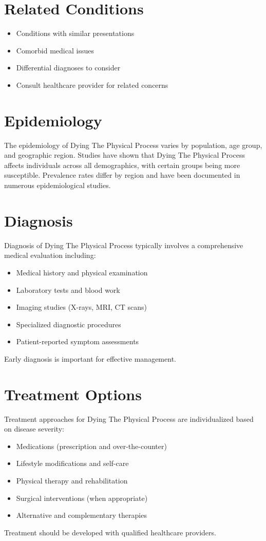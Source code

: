 \section*{Related Conditions}
\begin{itemize}
  \item Conditions with similar presentations
  \item Comorbid medical issues
  \item Differential diagnoses to consider
  \item Consult healthcare provider for related concerns
\end{itemize}

\section*{Epidemiology}
The epidemiology of Dying The Physical Process varies by population, age group, and geographic region. Studies have shown that Dying The Physical Process affects individuals across all demographics, with certain groups being more susceptible. Prevalence rates differ by region and have been documented in numerous epidemiological studies.

\section*{Diagnosis}
Diagnosis of Dying The Physical Process typically involves a comprehensive medical evaluation including:
\begin{itemize}
  \item Medical history and physical examination
  \item Laboratory tests and blood work
  \item Imaging studies (X-rays, MRI, CT scans)
  \item Specialized diagnostic procedures
  \item Patient-reported symptom assessments
\end{itemize}
Early diagnosis is important for effective management.

\section*{Treatment Options}
Treatment approaches for Dying The Physical Process are individualized based on disease severity:
\begin{itemize}
  \item Medications (prescription and over-the-counter)
  \item Lifestyle modifications and self-care
  \item Physical therapy and rehabilitation
  \item Surgical interventions (when appropriate)
  \item Alternative and complementary therapies
\end{itemize}
Treatment should be developed with qualified healthcare providers.

